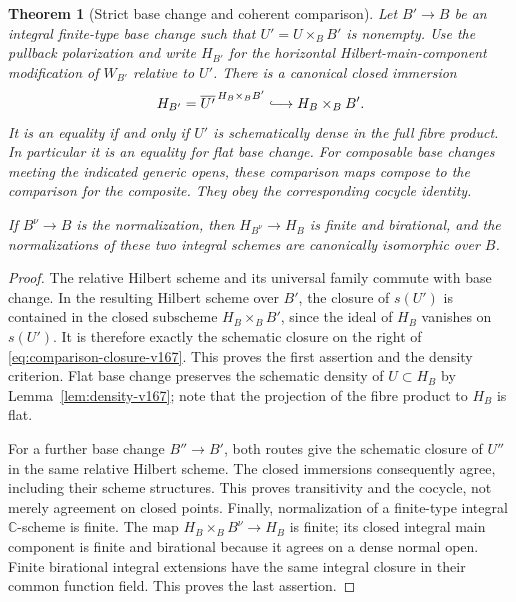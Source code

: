 \documentclass[11pt,reqno]{amsart}
\numberwithin{equation}{section}
\newtheorem{theorem}{Theorem}[section]
\theoremstyle{definition}\newtheorem{definition}[theorem]{Definition}
\theoremstyle{remark}\newtheorem{remark}[theorem]{Remark}
\newcommand{\C}{\mathbb C}\newcommand{\Q}{\mathbb Q}
\begin{document}
\begin{theorem}[Strict base change and coherent comparison]
\label{thm:basechange-v167}
Let $B'\to B$ be an integral finite-type base change such that
$U'=U\times_BB'$ is nonempty. Use the pullback polarization and
write $H_{B'}$ for the horizontal Hilbert-main-component
modification of $W_{B'}$ relative to $U'$. There is a canonical
closed immersion
\begin{equation}\label{eq:comparison-closure-v167}
 H_{B'}=\overline{U'}^{\,H_B\times_BB'}
                    \lhook\joinrel\longrightarrow H_B\times_BB'.
\end{equation}
It is an equality if and only if $U'$ is schematically dense in
the full fibre product. In particular it is an equality for flat
base change. For composable base changes meeting the indicated
generic opens, these comparison maps compose to the comparison
for the composite. They obey the corresponding cocycle identity.

If $B^\nu\to B$ is the normalization, then $H_{B^\nu}\to H_B$
is finite and birational, and the normalizations of these two
integral schemes are canonically isomorphic over $B$.
\end{theorem}
\begin{proof}
The relative Hilbert scheme and its universal family commute with
base change. In the resulting Hilbert scheme over $B'$, the
closure of $s(U')$ is contained in the closed subscheme
$H_B\times_BB'$, since the ideal of $H_B$ vanishes on $s(U')$.
It is therefore exactly the schematic closure on the right of
\eqref{eq:comparison-closure-v167}. This proves the first
assertion and the density criterion. Flat base change preserves
the schematic density of $U\subset H_B$ by
Lemma~\ref{lem:density-v167}; note that the projection of the
fibre product to $H_B$ is flat.

For a further base change $B''\to B'$, both routes give the
schematic closure of $U''$ in the same relative Hilbert scheme.
The closed immersions consequently agree, including their scheme
structures. This proves transitivity and the cocycle, not merely
agreement on closed points. Finally, normalization of a finite-type
integral $\C$-scheme is finite. The map
$H_B\times_B B^\nu\to H_B$ is finite; its closed integral main
component is finite and birational because it agrees on a dense
normal open. Finite birational integral extensions have the same
integral closure in their common function field. This proves the
last assertion.
\end{proof}
\end{document}
